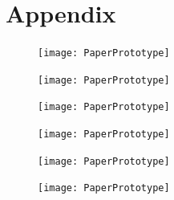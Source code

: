 \documentclass[letter]{article}
\begin{document}
\section*{Appendix}
\begin{figure}[H]
	\texttt{[image: PaperPrototype]}
\end{figure}
\begin{figure}[H]
	\texttt{[image: PaperPrototype]}
\end{figure}
\begin{figure}[H]
	\texttt{[image: PaperPrototype]}
\end{figure}
\begin{figure}[H]
	\texttt{[image: PaperPrototype]}
\end{figure}
\begin{figure}[H]
	\texttt{[image: PaperPrototype]}
\end{figure}
\begin{figure}[H]
	\texttt{[image: PaperPrototype]}
\end{figure}
\end{document}
